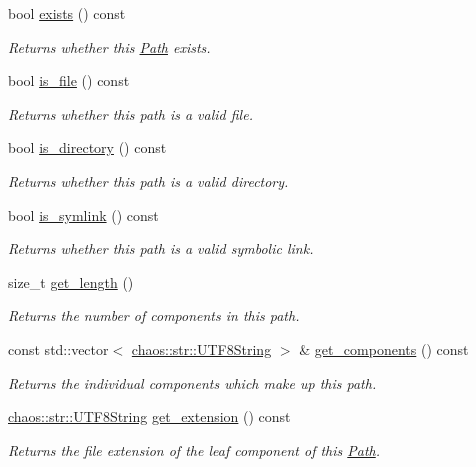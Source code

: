 \begin{DoxyCompactItemize}
bool \hyperlink{classchaos_1_1io_1_1sys_1_1_path_a8e1914d8585fedfd472e1de77f7029ad}{exists} () const 
\begin{DoxyCompactList}\small\item\em Returns whether this \hyperlink{classchaos_1_1io_1_1sys_1_1_path}{Path} exists. \end{DoxyCompactList}\item 
bool \hyperlink{classchaos_1_1io_1_1sys_1_1_path_af69b27d907ad47c9edc59c63f6ac1806}{is\+\_\+file} () const 
\begin{DoxyCompactList}\small\item\em Returns whether this path is a valid file. \end{DoxyCompactList}\item 
bool \hyperlink{classchaos_1_1io_1_1sys_1_1_path_ac1726d8964721ce0bd31c66a929e8ebd}{is\+\_\+directory} () const 
\begin{DoxyCompactList}\small\item\em Returns whether this path is a valid directory. \end{DoxyCompactList}\item 
bool \hyperlink{classchaos_1_1io_1_1sys_1_1_path_ac5d767353e874ca342c7b9c64f6aaa62}{is\+\_\+symlink} () const 
\begin{DoxyCompactList}\small\item\em Returns whether this path is a valid symbolic link. \end{DoxyCompactList}\item 
size\+\_\+t \hyperlink{classchaos_1_1io_1_1sys_1_1_path_a66471e8a3b9115f1df2ef9c8a337796e}{get\+\_\+length} ()
\begin{DoxyCompactList}\small\item\em Returns the number of components in this path. \end{DoxyCompactList}\item 
const std\+::vector$<$ \hyperlink{classchaos_1_1str_1_1_u_t_f8_string}{chaos\+::str\+::\+U\+T\+F8\+String} $>$ \& \hyperlink{classchaos_1_1io_1_1sys_1_1_path_aaf17e52f65bbacf011ac08bfc7e3c8e6}{get\+\_\+components} () const 
\begin{DoxyCompactList}\small\item\em Returns the individual components which make up this path. \end{DoxyCompactList}\item 
\hyperlink{classchaos_1_1str_1_1_u_t_f8_string}{chaos\+::str\+::\+U\+T\+F8\+String} \hyperlink{classchaos_1_1io_1_1sys_1_1_path_ad591f4f01947e1d0df1ffa33e77d5660}{get\+\_\+extension} () const 
\begin{DoxyCompactList}\small\item\em Returns the file extension of the leaf component of this \hyperlink{classchaos_1_1io_1_1sys_1_1_path}{Path}. \end{DoxyCompactList}\end{DoxyCompactItemize}


